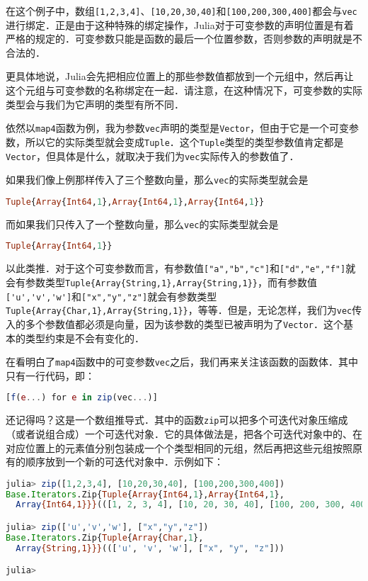 在这个例子中，数组\verb|[1,2,3,4]|、\verb|[10,20,30,40]|和\verb|[100,200,300,400]|都会与\verb|vec|进行绑定．正是由于这种特殊的绑定操作，Julia对于可变参数的声明位置是有着严格的规定的．可变参数只能是函数的最后一个位置参数，否则参数的声明就是不合法的．

更具体地说，Julia会先把相应位置上的那些参数值都放到一个元组中，然后再让这个元组与可变参数的名称绑定在一起．请注意，在这种情况下，可变参数的实际类型会与我们为它声明的类型有所不同．

依然以\verb|map4|函数为例，我为参数\verb|vec|声明的类型是\verb|Vector|，但由于它是一个可变参数，所以它的实际类型就会变成\verb|Tuple|．这个\verb|Tuple|类型的类型参数值肯定都是\verb|Vector|，但具体是什么，就取决于我们为\verb|vec|实际传入的参数值了．

如果我们像上例那样传入了三个整数向量，那么\verb|vec|的实际类型就会是

\begin{lstlisting}[language=julia]
Tuple{Array{Int64,1},Array{Int64,1},Array{Int64,1}}
\end{lstlisting}

而如果我们只传入了一个整数向量，那么\verb|vec|的实际类型就会是

\begin{lstlisting}[language=julia]
Tuple{Array{Int64,1}}
\end{lstlisting}

以此类推．对于这个可变参数而言，有参数值\verb|["a","b","c"]|和\verb|["d","e","f"]|就会有参数类型\verb|Tuple{Array{String,1},Array{String,1}}|，而有参数值\verb|['u','v','w']|和\verb|["x","y","z"]|就会有参数类型\verb|Tuple{Array{Char,1},Array{String,1}}|，等等．但是，无论怎样，我们为\verb|vec|传入的多个参数值都必须是向量，因为该参数的类型已被声明为了\verb|Vector|．这个基本的类型约束是不会有变化的．

在看明白了\verb|map4|函数中的可变参数\verb|vec|之后，我们再来关注该函数的函数体．其中只有一行代码，即：

\begin{lstlisting}[language=julia]
[f(e...) for e in zip(vec...)]
\end{lstlisting}

还记得吗？这是一个数组推导式．其中的函数\verb|zip|可以把多个可迭代对象压缩成（或者说组合成）一个可迭代对象．它的具体做法是，把各个可迭代对象中的、在对应位置上的元素值分别包装成一个个类型相同的元组，然后再把这些元组按照原有的顺序放到一个新的可迭代对象中．示例如下：

\begin{lstlisting}[language=julia]
julia> zip([1,2,3,4], [10,20,30,40], [100,200,300,400])
Base.Iterators.Zip{Tuple{Array{Int64,1},Array{Int64,1},
  Array{Int64,1}}}(([1, 2, 3, 4], [10, 20, 30, 40], [100, 200, 300, 400]))

julia> zip(['u','v','w'], ["x","y","z"])
Base.Iterators.Zip{Tuple{Array{Char,1},
  Array{String,1}}}((['u', 'v', 'w'], ["x", "y", "z"]))

julia> 
\end{lstlisting}

